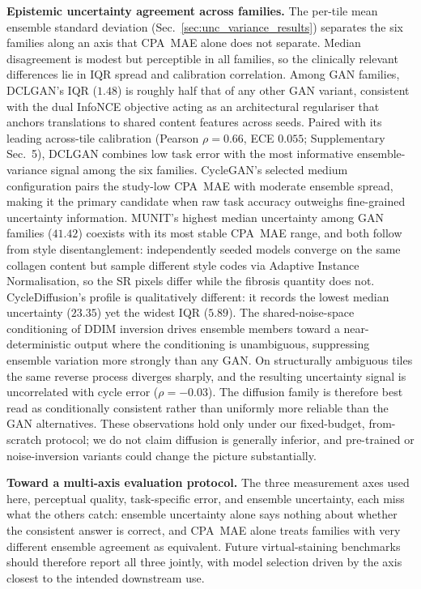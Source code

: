 \noindent\textbf{Epistemic uncertainty agreement across families.}
The per-tile mean ensemble standard deviation (Sec.~\ref{sec:unc_variance_results}) separates
the six families along an axis that CPA~MAE alone does not separate.
Median disagreement is modest but perceptible in all families, so the clinically relevant
differences lie in IQR spread and calibration correlation.
Among GAN families, DCLGAN's IQR ($1.48$) is roughly half that of any other GAN
variant, consistent with the dual InfoNCE objective acting as an architectural
regulariser that anchors translations to shared content features across seeds.
Paired with its leading across-tile calibration (Pearson $\rho = 0.66$, ECE $0.055$;
Supplementary Sec.~5), DCLGAN combines low task error with the most informative
ensemble-variance signal among the six families.
CycleGAN's selected medium configuration pairs the study-low CPA~MAE with moderate
ensemble spread, making it the primary candidate when raw task accuracy outweighs
fine-grained uncertainty information.
MUNIT's highest median uncertainty among GAN families ($41.42$) coexists with its most
stable CPA~MAE range, and both follow from style disentanglement: independently seeded
models converge on the same collagen content but sample different style codes via
Adaptive Instance Normalisation, so the SR pixels differ while the fibrosis quantity
does not.
CycleDiffusion's profile is qualitatively different: it records the lowest median
uncertainty ($23.35$) yet the widest IQR ($5.89$).
The shared-noise-space conditioning of DDIM inversion drives ensemble members toward
a near-deterministic output where the conditioning is unambiguous, suppressing
ensemble variation more strongly than any GAN.
On structurally ambiguous tiles the same reverse process diverges sharply, and the
resulting uncertainty signal is uncorrelated with cycle error ($\rho = {-}0.03$).
The diffusion family is therefore best read as conditionally consistent rather than
uniformly more reliable than the GAN alternatives.
These observations hold only under our fixed-budget, from-scratch protocol; we do not
claim diffusion is generally inferior, and pre-trained or noise-inversion variants could
change the picture substantially.

\noindent\textbf{Toward a multi-axis evaluation protocol.}
The three measurement axes used here, perceptual quality, task-specific error, and
ensemble uncertainty, each miss what the others catch: ensemble uncertainty alone says
nothing about whether the consistent answer is correct, and CPA~MAE alone treats
families with very different ensemble agreement as equivalent.
Future virtual-staining benchmarks should therefore report all three jointly, with model
selection driven by the axis closest to the intended downstream use.

